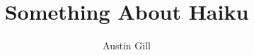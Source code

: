 \documentclass[12pt]{../sdsmt-thesis/thesis}
\title{Something About Haiku}
\author{Austin Gill}
\newcommand{\onlyinsubfile}[1]{#1}
\newcommand{\notinsubfile}[1]{}
\begin{document}
\renewcommand{\onlyinsubfile}[1]{}
\renewcommand{\notinsubfile}[1]{#1}
\maketitle

\makecopyright{}
\preliminaries{}

\begin{abstract}

\end{abstract}

\begin{acknowledgments}

\end{acknowledgments}

\tableofcontents
\listoftables
\listoffigures

\begin{preface}

\end{preface}

\body{}







\supplementaries{}


\begin{appendices}
\end{appendices}
\end{document}
